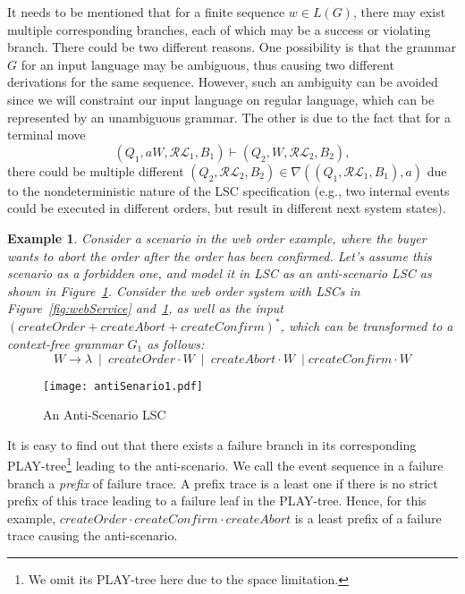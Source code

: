 \documentclass[]{llncs}
\newtheorem{Ex}{Example}
\begin{document}
It needs to be mentioned that for a finite sequence $w \in L(G)$,
there may exist multiple corresponding branches, each of which may be a
success or violating branch. There could be two different reasons.
One possibility is that the grammar $G$ for an input language may be
ambiguous, thus causing two different derivations for the same sequence.
However, such an ambiguity can be avoided since we will constraint our input
language on regular language, which can be represented by an unambiguous grammar. The other is due to the fact that for a terminal move
\[
 (Q_1, aW, \mathcal{RL}_1, B_1) \vdash (Q_2, W, \mathcal{RL}_2, B_2),
\]
there could be multiple different $(Q_2, \mathcal{RL}_2, B_2) \in \nabla((Q_1, \mathcal{RL}_1, B_1), a)$
due to the nondeterministic nature of the LSC specification (e.g., two
internal events could be executed in different orders, but
result in different next system states).








\begin{Ex}
  Consider a scenario in the web order example, where the buyer wants
  to abort the order after the order has been confirmed. Let's assume
  this scenario as a forbidden one, and model it in LSC as an anti-scenario LSC
  as shown in Figure~\ref{fig:anti}.
  Consider the web order system with LSCs in Figure~\ref{fig:webService} and~\ref{fig:anti},
  as well as the input $(createOrder+createAbort+createConfirm)^{*}$,
  which can be transformed to a context-free grammar
  $G_1$ as follows:
  \[
    W \rightarrow \lambda\ \mid\ createOrder\cdot W \ \mid\ createAbort\cdot W \ \mid createConfirm \cdot W
  \]
\label{ex:webService2}
\end{Ex}


\begin{figure}

  \begin{center}
    \texttt{[image: antiSenario1.pdf]}
  \end{center}

  \caption{An Anti-Scenario LSC}
  \label{fig:anti}
\end{figure}

It is easy to find out that there exists a failure branch
in its corresponding PLAY-tree\footnote{We omit its PLAY-tree
here due to the space limitation.} leading to the anti-scenario.
We call the event sequence in a failure branch
a {\em prefix} of failure trace. A prefix trace is a least one if
there is no strict prefix of this trace leading to a failure leaf
in the PLAY-tree. Hence, for this example,
$createOrder\cdot createConfirm\cdot createAbort$ is
a least prefix of a failure trace causing the anti-scenario.
\end{document}
